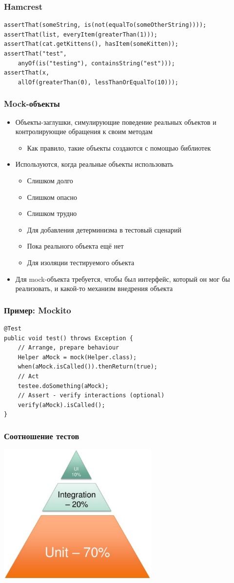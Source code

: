 \documentclass[xetex,mathserif,serif]{beamer}
\begin{document}
	\begin{frame}[fragile]
		\frametitle{Hamcrest}
		\begin{verbatim}
assertThat(someString, is(not(equalTo(someOtherString))));
assertThat(list, everyItem(greaterThan(1)));
assertThat(cat.getKittens(), hasItem(someKitten));
assertThat("test", 
    anyOf(is("testing"), containsString("est")));
assertThat(x, 
    allOf(greaterThan(0), lessThanOrEqualTo(10)));
		\end{verbatim}
\end{frame}

	\begin{frame}
		\frametitle{Mock-объекты}
		\begin{itemize}
			\item Объекты-заглушки, симулирующие поведение реальных объектов и контролирующие обращения к своим методам
			\begin{itemize}
				\item Как правило, такие объекты создаются с помощью библиотек
			\end{itemize}
			\item Используются, когда реальные объекты использовать
			\begin{itemize}
				\item Слишком долго
				\item Слишком опасно
				\item Слишком трудно
				\item Для добавления детерминизма в тестовый сценарий
				\item Пока реального объекта ещё нет
				\item Для изоляции тестируемого объекта
			\end{itemize}
			\item Для mock-объекта требуется, чтобы был интерфейс, который он мог бы реализовать, и какой-то механизм внедрения объекта
		\end{itemize}
	\end{frame}

	\begin{frame}[fragile]
		\frametitle{Пример: Mockito}
		\begin{verbatim}
@Test
public void test() throws Exception {
    // Arrange, prepare behaviour
    Helper aMock = mock(Helper.class);
    when(aMock.isCalled()).thenReturn(true);
    // Act
    testee.doSomething(aMock);
    // Assert - verify interactions (optional)
    verify(aMock).isCalled();
}
		\end{verbatim}
\end{frame}

	\begin{frame}
		\frametitle{Соотношение тестов}
		\begin{center}
			\includegraphics[width=0.6\textwidth]{testsProportions.png}
		\end{center}
	\end{frame}
\end{document}
